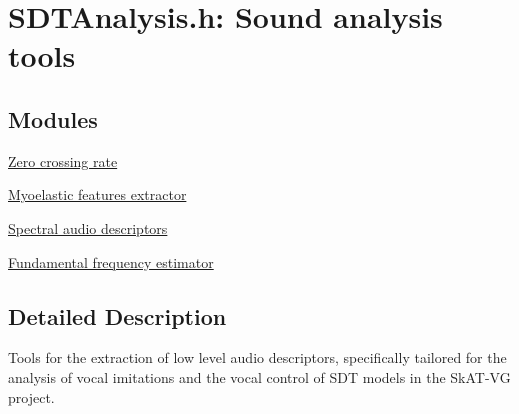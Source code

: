 \hypertarget{group__analysis}{}\section{S\+D\+T\+Analysis.\+h\+: Sound analysis tools}
\label{group__analysis}
\subsection*{Modules}
\begin{DoxyCompactItemize}
\item 
\hyperlink{group__zerocrossing}{Zero crossing rate}
\item 
\hyperlink{group__myoelastic}{Myoelastic features extractor}
\item 
\hyperlink{group__spectralfeats}{Spectral audio descriptors}
\item 
\hyperlink{group__pitch}{Fundamental frequency estimator}
\end{DoxyCompactItemize}


\subsection{Detailed Description}
Tools for the extraction of low level audio descriptors, specifically tailored for the analysis of vocal imitations and the vocal control of S\+D\+T models in the Sk\+A\+T-\/\+V\+G project. 